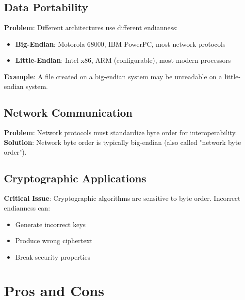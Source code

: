 \documentclass[11pt,a4paper]{article}
\begin{document}
\subsection{Data Portability}

\begin{warningbox}
\textbf{Problem}: Different architectures use different endianness:
\begin{itemize}
    \item \textbf{Big-Endian}: Motorola 68000, IBM PowerPC, most network protocols
    \item \textbf{Little-Endian}: Intel x86, ARM (configurable), most modern processors
\end{itemize}
\end{warningbox}

\textbf{Example}: A file created on a big-endian system may be unreadable on a little-endian system.

\subsection{Network Communication}

\begin{warningbox}
\textbf{Problem}: Network protocols must standardize byte order for interoperability.\\
\textbf{Solution}: Network byte order is typically big-endian (also called "network byte order").
\end{warningbox}

\subsection{Cryptographic Applications}

\begin{warningbox}
\textbf{Critical Issue}: Cryptographic algorithms are sensitive to byte order. Incorrect endianness can:
\begin{itemize}
    \item Generate incorrect keys
    \item Produce wrong ciphertext
    \item Break security properties
\end{itemize}
\end{warningbox}

\section{Pros and Cons}
\end{document}
